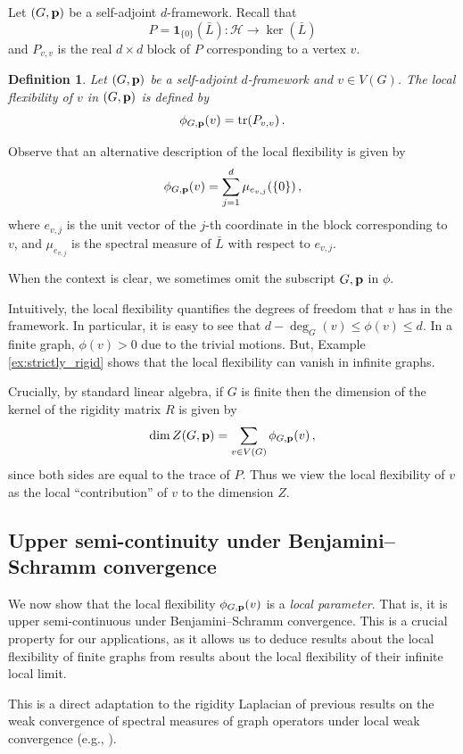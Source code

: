 \documentclass[10pt,a4paper]{amsart}
\numberwithin{equation}{section}
\newtheorem{definition}[theorem]{Definition}
\newcommand{\cH}{\mathcal H}
\newcommand{\p}{{\bf p}}
\newcommand{\tr}{{\mathrm {tr}}}
\begin{document}
Let $(G,\p)$ be a self-adjoint $d$-framework. 
Recall that 
    \[
    P=\mathbf 1_{\{0\}}(\bar L):\cH\to \ker(\bar L)
    \]
    and $P_{v,v}$ is the real $d\times d$ block of $P$ corresponding to a vertex $v$. 
\begin{definition}
Let $(G,\p)$ be a self-adjoint $d$-framework and $v\in V(G)$. The {\em local flexibility} of $v$ in $(G,\p)$ is defined by
    \[
    \phi_{G,\p}(v)=\tr(P_{v,v})\,.
    \]
\end{definition}
Observe that an alternative description of the local flexibility is given by
\[
\phi_{G,\p}(v) = \sum_{j=1}^d \mu_{e_{v,j}}(\{0\})\,,
\]
where $e_{v,j}$ is the unit vector of the $j$-th coordinate in the block corresponding to $v$, and $\mu_{e_{v,j}}$ is the spectral measure of $\bar L$ with respect to $e_{v,j}$.

When the context is clear, we sometimes omit the subscript $G,\p$ in $\phi$.

Intuitively, the local flexibility quantifies the degrees of freedom that $v$ has in the framework. 
In particular, it is easy to see that $d-\deg_G(v)\le \phi (v)\le d$. In a finite graph, $\phi(v)>0$ due to the trivial motions. 
But, Example \ref{ex:strictly_rigid} shows that the local flexibility can vanish in infinite graphs.


Crucially, by standard linear algebra, if $G$ is finite then the dimension of the kernel of the rigidity matrix $R$ is given by
\begin{equation}\label{eq:dimZ_local}
\dim Z(G,\p) = \sum_{v\in V(G)} \phi_{G,\p}(v)\,,
\end{equation}
since both sides are equal to the trace of $P$. Thus we  view the local flexibility of $v$ as the local ``contribution'' of $v$ to the dimension $Z$.

\subsection{Upper semi-continuity under Benjamini--Schramm convergence}
We now show that the local flexibility $\phi_{G,\p}(v)$ is a {\em local parameter}. That is, it is upper semi-continuous 
under Benjamini--Schramm convergence. This is a crucial property for our applications, as it allows us to deduce results about the local flexibility of finite graphs from results about the local flexibility of their infinite local limit.

This is a direct adaptation to the rigidity Laplacian of previous results on the weak convergence of spectral measures of graph operators under local weak convergence (e.g., \cite{BordenaveLelargeSalezDiluted,AbertThomViragSpectralMeasure}).
\end{document}
